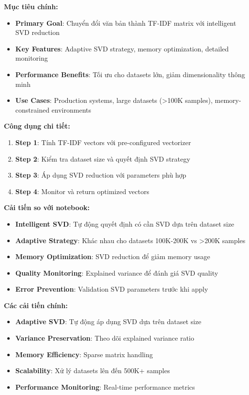 \textbf{Mục tiêu chính:}
\begin{itemize}
    \item \textbf{Primary Goal}: Chuyển đổi văn bản thành TF-IDF matrix với intelligent SVD reduction
    \item \textbf{Key Features}: Adaptive SVD strategy, memory optimization, detailed monitoring
    \item \textbf{Performance Benefits}: Tối ưu cho datasets lớn, giảm dimensionality thông minh
    \item \textbf{Use Cases}: Production systems, large datasets (>100K samples), memory-constrained environments
\end{itemize}

\textbf{Công dụng chi tiết:}
\begin{enumerate}
    \item \textbf{Step 1}: Tính TF-IDF vectors với pre-configured vectorizer
    \item \textbf{Step 2}: Kiểm tra dataset size và quyết định SVD strategy
    \item \textbf{Step 3}: Áp dụng SVD reduction với parameters phù hợp
    \item \textbf{Step 4}: Monitor và return optimized vectors
\end{enumerate}

\textbf{Cải tiến so với notebook:}
\begin{itemize}
    \item \textbf{Intelligent SVD}: Tự động quyết định có cần SVD dựa trên dataset size
    \item \textbf{Adaptive Strategy}: Khác nhau cho datasets 100K-200K vs >200K samples
    \item \textbf{Memory Optimization}: SVD reduction để giảm memory usage
    \item \textbf{Quality Monitoring}: Explained variance để đánh giá SVD quality
    \item \textbf{Error Prevention}: Validation SVD parameters trước khi apply
\end{itemize}

\textbf{Các cải tiến chính:}
\begin{itemize}
    \item \textbf{Adaptive SVD}: Tự động áp dụng SVD dựa trên dataset size
    \item \textbf{Variance Preservation}: Theo dõi explained variance ratio
    \item \textbf{Memory Efficiency}: Sparse matrix handling
    \item \textbf{Scalability}: Xử lý datasets lên đến 500K+ samples
    \item \textbf{Performance Monitoring}: Real-time performance metrics
\end{itemize}


